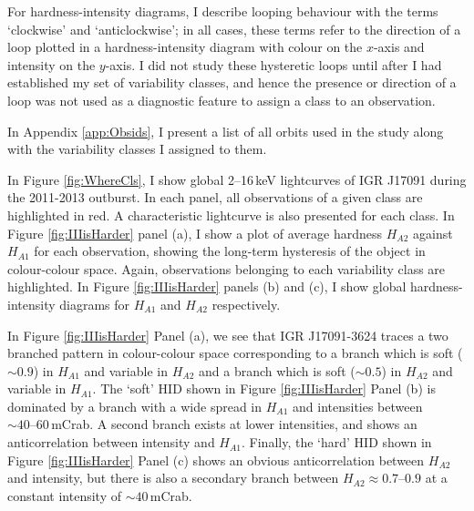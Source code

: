\par For hardness-intensity diagrams, I describe looping behaviour with the terms `clockwise' and `anticlockwise'; in all cases, these terms refer to the direction of a loop plotted in a hardness-intensity diagram with colour on the $x$-axis and intensity on the $y$-axis.  I did not study these hysteretic loops until after I had established my set of variability classes, and hence the presence or direction of a loop was not used as a diagnostic feature to assign a class to an observation.
\par In Appendix \ref{app:Obsids}, I present a list of all orbits used in the study along with the variability classes I assigned to them.
\par In Figure \ref{fig:WhereCls}, I show global 2--16\,keV lightcurves of IGR J17091 during the 2011-2013 outburst.  In each panel, all observations of a given class are highlighted in red.  A characteristic lightcurve is also presented for each class.  In Figure \ref{fig:IIIisHarder} panel (a), I show a plot of average hardness $H_{A2}$ against $H_{A1}$ for each observation, showing the long-term hysteresis of the object in colour-colour space.  Again, observations belonging to each variability class are highlighted.  In Figure \ref{fig:IIIisHarder} panels (b) and (c), I show global hardness-intensity diagrams for $H_{A1}$ and $H_{A2}$ respectively.
\par In Figure \ref{fig:IIIisHarder} Panel (a), we see that IGR J17091-3624 traces a two branched pattern in colour-colour space corresponding to a branch which is soft ($\sim0.9$) in $H_{A1}$ and variable in $H_{A2}$ and a branch which is soft ($\sim0.5$) in $H_{A2}$ and variable in $H_{A1}$.  The `soft' HID shown in Figure \ref{fig:IIIisHarder} Panel (b) is dominated by a branch with a wide spread in $H_{A1}$ and intensities between $\sim40\mbox{--}60$\,mCrab.  A second branch exists at lower intensities, and shows an anticorrelation between intensity and $H_{A1}$.  Finally, the `hard' HID shown in Figure \ref{fig:IIIisHarder} Panel (c) shows an obvious anticorrelation between $H_{A2}$ and intensity, but there is also a secondary branch between $H_{A2}\approx 0.7\mbox{--}0.9$ at a constant intensity of $\sim40$\,mCrab.

